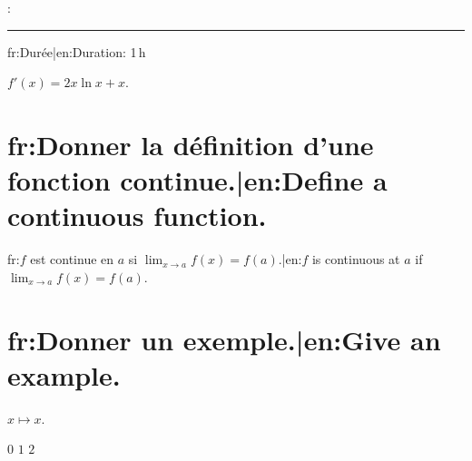 \documentclass[11pt,a4paper,addpoints]{exam}
\begin{document}
: \rule{6cm}{0.4pt} \hfill {{fr:Durée|en:Duration}}: 1\,h

\begin{center}
  \gradetable[h][questions]
\end{center}

\begin{questions}

\begin{solution}
  $f'(x) = 2x \ln x + x$.
\end{solution}

\begin{parts}
  \part[2] {{fr:Donner la définition d'une fonction continue.|en:Define a continuous function.}}
  \begin{solution}[3cm]
    {{fr:$f$ est continue en $a$ si $\lim_{x \to a} f(x) = f(a)$.|en:$f$ is continuous at $a$ if $\lim_{x \to a} f(x) = f(a)$.}}
  \end{solution}
  \part[2] {{fr:Donner un exemple.|en:Give an example.}}
  \begin{solution}[2cm]
    $x \mapsto x$.
  \end{solution}
\end{parts}

\begin{choices}
  \choice $0$
  \CorrectChoice $1$
  \choice $2$
\end{choices}

\end{questions}
\end{document}
